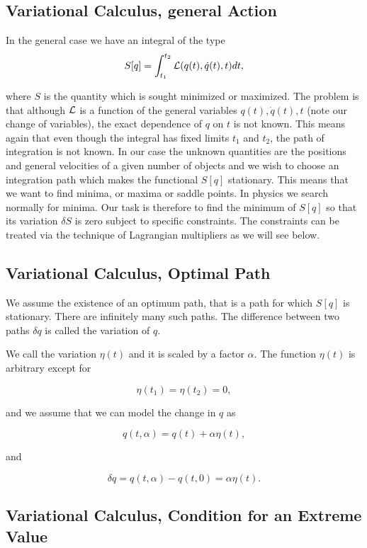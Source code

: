 \documentclass[%
oneside,                 %
final,                   %
10pt]{article}
\begin{document}
\subsection{Variational Calculus, general Action}

In the general case we have an integral of the type
\[ 
S[q]= \int_{t_1}^{t_2} {\cal L}(q(t),\dot{q}(t),t)dt,
\]

where $S$ is the quantity which is sought minimized or maximized.  The
problem is that although ${\cal L}$  is a function of the general variables
$q(t),\dot{q}(t),t$ (note our change of variables), the exact dependence of $q$ on $t$ is not known.
This means again that even though the integral has fixed limits $t_1$
and $t_2$, the path of integration is not known. In our case the unknown
quantities are the positions and general velocities of a given number
of objects and we wish to choose an integration path which makes the
functional $S[q]$ stationary. This means that we want to find minima,
or maxima or saddle points. In physics we search normally for minima.
Our task is therefore to find the minimum of $S[q]$ so that its
variation $\delta S$ is zero subject to specific constraints.  The
constraints can be treated via the technique of Lagrangian multipliers
as we will see below.

\subsection{Variational Calculus, Optimal Path}

We assume the existence of an optimum path, that is a path for which
$S[q]$ is stationary. There are infinitely many such paths.  The
difference between two paths $\delta q$ is called the variation of
$q$.

We call the variation $\eta(t)$ and it is scaled by a factor $\alpha$.
The function $\eta(t)$ is arbitrary except for

\[
\eta(t_1)=\eta(t_2)=0,
\]

and we assume that we can model the change in $q$ as

\[
q(t,\alpha) = q(t)+\alpha\eta(t),
\]

and

\[
\delta q = q(t,\alpha) -q(t,0)=\alpha\eta(t).
\]

\subsection{Variational Calculus, Condition for an Extreme Value}
\end{document}
